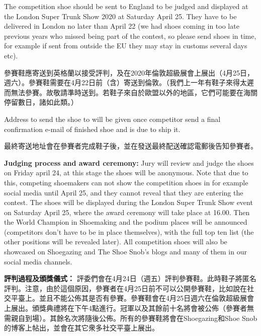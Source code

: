 \begin{paracol}{2}
        The competition shoe should be sent to England to be judged and displayed at the London Super Trunk Show 2020 at Saturday April 25. They have to be delivered in London no later than April 22 (we had shoes coming in too late previous years who missed being part of the contest, so please send shoes in time, for example if sent from outside the EU they may stay in customs several days etc).

        \switchcolumn
        參賽鞋應寄送到英格蘭以接受評判，及在2020年倫敦超級展會上展出（4月25日，週六）。參賽鞋需要在4月22日前（含）寄送到倫敦。（我們上一年有鞋子來得太遲而無法參賽。故敬請準時送到。若鞋子來自於歐盟以外的地區，它們可能要在海關停留數日，諸如此類。）
        \switchcolumn*

        Address to send the shoe to will be given once competitor send a final confirmation e-mail of finished shoe and is due to ship it.

        \vspace{1em}

        \switchcolumn
        最終寄送地址會在參賽者完成鞋子後，並在發送最終配送確認電郵後告知參賽者。
        \switchcolumn*

        \textbf{Judging process and award ceremony:}
        Jury will review and judge the shoes on Friday april 24, at this stage the shoes will be anonymous. Note that due to this, competing shoemakers can not show the competition shoes in for example social media until April 25, and they cannot reveal that they are entering the contest. The shoes will be displayed during the London Super Trunk Show event on Saturday April 25, where the award ceremony will take place at 16.00. Then the World Champion in Shoemaking and the podium places will be announced (competitors don't have to be in place themselves), with the full top ten list (the other positions will be revealed later). All competition shoes will also be showcased on Shoegazing and The Shoe Snob’s blogs and many of them in our social media channels.

        \vspace{1em}

        \switchcolumn
        \textbf{評判過程及頒獎儀式：}
        評委們會在4月24日（週五）評判參賽鞋。此時鞋子將匿名評判。注意，由於這個原因，參賽者在4月25日前不可以公開參賽鞋，比如說在社交平臺上。並且不能公佈其是否有參賽。參賽鞋會在4月25日週六在倫敦超級展會上展出。頒獎典禮將在下午4點進行。冠軍以及其餘前十名將會被公佈（參賽者無需親自到場）。其餘名次將隨後公佈。所有的參賽鞋將會在Shoegazing和Shoe Snob的博客上帖出，並會在其它衆多社交平臺上展出。
        \switchcolumn*


\end{paracol}
